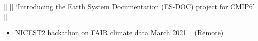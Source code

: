 \begin{talks}
    \talk
	{\faCommentingO \hspace{1mm} [\faUserPlus] \hspace{1mm} [\faEnvelopeO] \hspace{1mm} `Introducing the Earth System Documentation (ES-DOC) project for CMIP6' [\href{https://github.com/sadielbartholomew/sadielbartholomew/blob/master/talks-and-workshops/es-doc-for-cmip6-intro.pdf}{\small{\linkSymbol}}]}
	{
	\begin{itemize}[leftmargin=.4in]
	    \item \href{https://nordicesmhub.github.io/nicest2-fair-hackathon/}{NICEST2 hackathon on FAIR climate data}
	    \hfill March 2021 ~ (Remote)
	\end{itemize}
	}

\end{talks}
